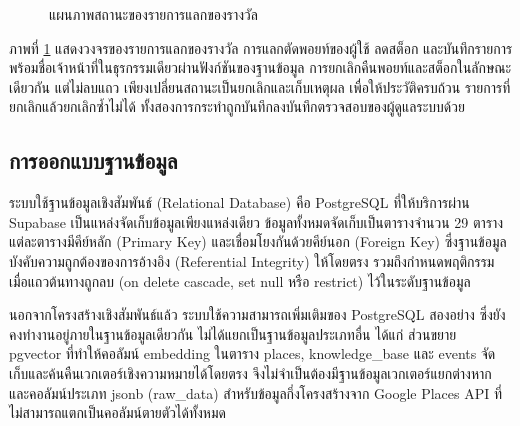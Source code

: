 \begin{figure}[H]
\centering
{}
\caption{แผนภาพสถานะของรายการแลกของรางวัล}
\label{fig:state_redemption}
\end{figure}

ภาพที่ \ref{fig:state_redemption} แสดงวงจรของรายการแลกของรางวัล การแลกตัดพอยท์ของผู้ใช้ ลดสต็อก และบันทึกรายการพร้อมชื่อเจ้าหน้าที่ในธุรกรรมเดียวผ่านฟังก์ชันของฐานข้อมูล การยกเลิกคืนพอยท์และสต็อกในลักษณะเดียวกัน แต่ไม่ลบแถว เพียงเปลี่ยนสถานะเป็นยกเลิกและเก็บเหตุผล เพื่อให้ประวัติครบถ้วน รายการที่ยกเลิกแล้วยกเลิกซ้ำไม่ได้ ทั้งสองการกระทำถูกบันทึกลงบันทึกตรวจสอบของผู้ดูแลระบบด้วย

\subsection{การออกแบบฐานข้อมูล}

ระบบใช้ฐานข้อมูลเชิงสัมพันธ์ (Relational Database) คือ PostgreSQL ที่ให้บริการผ่าน Supabase เป็นแหล่งจัดเก็บข้อมูลเพียงแหล่งเดียว ข้อมูลทั้งหมดจัดเก็บเป็นตารางจำนวน 29 ตาราง แต่ละตารางมีคีย์หลัก (Primary Key) และเชื่อมโยงกันด้วยคีย์นอก (Foreign Key) ซึ่งฐานข้อมูลบังคับความถูกต้องของการอ้างอิง (Referential Integrity) ให้โดยตรง รวมถึงกำหนดพฤติกรรมเมื่อแถวต้นทางถูกลบ (on delete cascade, set null หรือ restrict) ไว้ในระดับฐานข้อมูล

นอกจากโครงสร้างเชิงสัมพันธ์แล้ว ระบบใช้ความสามารถเพิ่มเติมของ PostgreSQL สองอย่าง ซึ่งยังคงทำงานอยู่ภายในฐานข้อมูลเดียวกัน ไม่ได้แยกเป็นฐานข้อมูลประเภทอื่น ได้แก่ ส่วนขยาย pgvector ที่ทำให้คอลัมน์ embedding ในตาราง places, knowledge\_base และ events จัดเก็บและค้นคืนเวกเตอร์เชิงความหมายได้โดยตรง จึงไม่จำเป็นต้องมีฐานข้อมูลเวกเตอร์แยกต่างหาก และคอลัมน์ประเภท jsonb (raw\_data) สำหรับข้อมูลกึ่งโครงสร้างจาก Google Places API ที่ไม่สามารถแตกเป็นคอลัมน์ตายตัวได้ทั้งหมด

